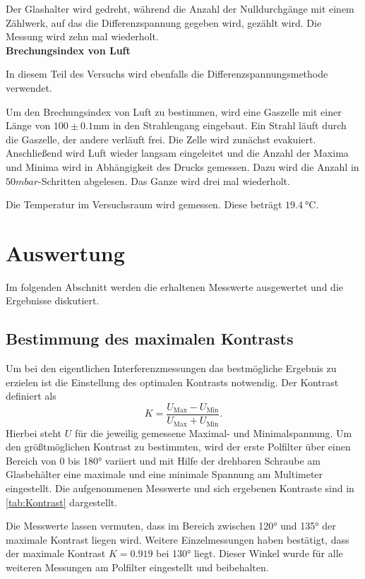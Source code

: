 Der Glashalter wird gedreht, während die Anzahl der Nulldurchgänge mit einem Zählwerk, auf das die Differenzspannung gegeben wird, gezählt wird. Die Messung wird zehn mal wiederholt.
\\
\textbf{Brechungsindex von Luft}

In diesem Teil des Versuchs wird ebenfalls die Differenzspannungsmethode verwendet.

Um den Brechungsindex von Luft zu bestimmen, wird eine Gaszelle mit einer Länge von $100 \pm 0.1 \si{\milli\meter}$ in den Strahlengang eingebaut. Ein Strahl läuft durch die Gaszelle, der andere verläuft frei. %
Die Zelle wird zunächst evakuiert. Anschließend wird Luft wieder langsam eingeleitet und die Anzahl der Maxima und Minima wird in Abhängigkeit des Drucks gemessen. Dazu wird die Anzahl in $50 mbar$-Schritten abgelesen. Das Ganze wird drei mal wiederholt. %

Die Temperatur im Versuchsraum wird gemessen. Diese beträgt $\SI{19.4}{\celsius}$.



\newpage
\section{Auswertung}
Im folgenden Abschnitt werden die erhaltenen Messwerte ausgewertet und die Ergebnisse diskutiert.
\subsection{Bestimmung des maximalen Kontrasts}
Um bei den eigentlichen Interferenzmessungen das bestmögliche Ergebnis zu erzielen ist die
Einstellung des optimalen Kontrasts notwendig.
Der Kontrast definiert als 
\begin{equation}
    K = \frac{U_\text{Max}-U_\text{Min}}{U_\text{Max}+U_\text{Min}}.
\end{equation}
Hierbei steht $U$ für die jeweilig gemessene Maximal- und Minimalspannung.
Um den größtmöglichen Kontrast zu bestimmten, wird der erste Polfilter über einen Bereich von 0 bis 180° 
variiert und mit Hilfe der drehbaren Schraube am Glasbehälter eine maximale und eine minimale Spannung am 
Multimeter eingestellt. 
Die aufgenommenen Messwerte und sich ergebenen Kontraste sind in \autoref{tab:Kontrast} dargestellt.
 
\FloatBarrier
Die Messwerte lassen vermuten, dass im Bereich zwischen 120° und 135° der maximale Kontrast liegen wird.
Weitere Einzelmessungen haben bestätigt, dass der maximale Kontrast $K=0.919$ bei 130° liegt.
Dieser Winkel wurde für alle weiteren Messungen am Polfilter eingestellt und beibehalten. 

